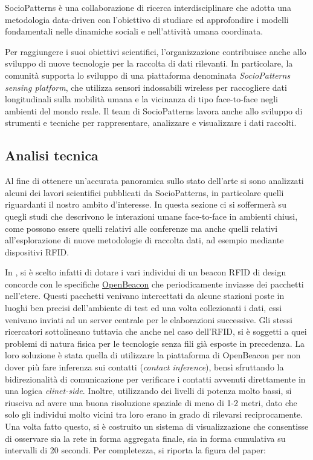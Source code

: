 \documentclass[12pt,twoside]{report}
\begin{document}
    SocioPatterns è una collaborazione di ricerca interdisciplinare che adotta una metodologia data-driven con l'obiettivo di studiare ed approfondire i modelli fondamentali nelle dinamiche sociali e nell'attività umana coordinata.

    Per raggiungere i suoi obiettivi scientifici, l'organizzazione contribuisce anche allo sviluppo di nuove tecnologie per la raccolta di dati rilevanti. In particolare, la comunità supporta lo sviluppo di una piattaforma denominata  \textit{SocioPatterns sensing platform}, che utilizza sensori indossabili wireless per raccogliere dati longitudinali sulla mobilità umana e la vicinanza di tipo face-to-face negli ambienti del mondo reale. Il team di SocioPatterns lavora anche allo sviluppo di strumenti e tecniche per rappresentare, analizzare e visualizzare i dati raccolti. 
    \subsection{Analisi tecnica}
    Al fine di ottenere un'accurata panoramica sullo stato dell'arte si sono analizzati alcuni dei lavori scientifici pubblicati da SocioPatterns, in particolare quelli riguardanti il nostro ambito d'interesse. In questa sezione ci si soffermerà su quegli studi che descrivono le interazioni umane face-to-face in ambienti chiusi, come possono essere quelli relativi alle conferenze \cite{sdc_iswc10} ma anche quelli relativi all'esplorazione di nuove metodologie di raccolta dati, ad esempio mediante dispositivi RFID.
    
    In \cite{2008arXiv0811.4170B}, si è scelto infatti di dotare i vari individui di un beacon RFID di design concorde con le specifiche \href{https://www.openbeacon.org/}{OpenBeacon} che periodicamente inviasse dei pacchetti nell'etere. Questi pacchetti venivano intercettati da alcune stazioni poste in luoghi ben precisi dell'ambiente di test ed una volta collezionati i dati, essi venivano inviati ad un server centrale per le elaborazioni successive. Gli stessi ricercatori sottolineano tuttavia che anche nel caso dell'RFID, si è soggetti a quei problemi di natura fisica per le tecnologie senza fili già esposte in precedenza. La loro soluzione è stata quella di utilizzare la piattaforma di OpenBeacon per non dover più fare inferenza sui contatti (\textit{contact inference}), bensì sfruttando la bidirezionalità di comunicazione per verificare i contatti avvenuti direttamente in una logica \textit{clinet-side}. Inoltre, utilizzando dei livelli di potenza molto bassi, si riusciva ad avere una buona risoluzione spaziale di meno di 1-2 metri, dato che solo gli individui molto vicini tra loro erano in grado di rilevarsi reciprocamente.\\
    Una volta fatto questo, si è costruito un sistema di visualizzazione che consentisse di osservare sia la rete in forma aggregata finale, sia in forma cumulativa su intervalli di 20 secondi. Per completezza, si riporta la figura del paper:
    
\end{document}
